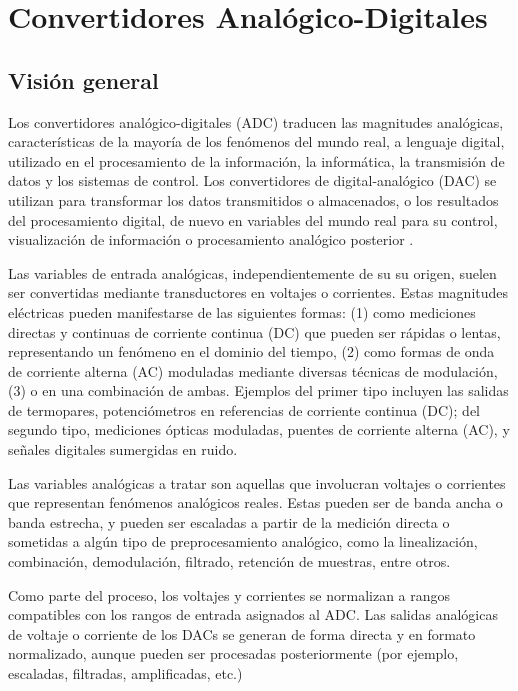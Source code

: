   \section{Convertidores Analógico-Digitales}

    \subsection{Visión general}

    Los convertidores analógico-digitales (ADC) traducen las magnitudes analógicas, características de la mayoría de los fenómenos del mundo real, a lenguaje digital, utilizado en el procesamiento de la información, la informática, la transmisión de datos y los sistemas de control. Los convertidores de digital-analógico (DAC) se utilizan para transformar los datos transmitidos o almacenados, o los resultados del procesamiento digital, de nuevo en variables del mundo real para su control, visualización de información o procesamiento analógico posterior \cite{Kester2007}.

    Las variables de entrada analógicas, independientemente de su su origen, suelen ser convertidas mediante transductores en voltajes o corrientes. Estas magnitudes eléctricas pueden manifestarse de las siguientes formas: (1) como mediciones directas y continuas de corriente continua (DC) que pueden ser rápidas o lentas, representando un fenómeno en el dominio del tiempo, (2) como formas de onda de corriente alterna (AC) moduladas mediante diversas técnicas de modulación, (3) o en una combinación de ambas. Ejemplos del primer tipo incluyen las salidas de termopares, potenciómetros en referencias de corriente continua (DC); del segundo tipo, mediciones ópticas moduladas, puentes de corriente alterna (AC), y señales digitales sumergidas en ruido.

    Las variables analógicas a tratar son aquellas que involucran voltajes o corrientes que representan fenómenos analógicos reales. Estas pueden ser de banda ancha o banda estrecha, y pueden ser escaladas a partir de la medición directa o sometidas a algún tipo de preprocesamiento analógico, como la linealización, combinación, demodulación, filtrado, retención de muestras, entre otros.

    Como parte del proceso, los voltajes y corrientes se normalizan a rangos compatibles con los rangos de entrada asignados al ADC. Las salidas analógicas de voltaje o corriente de los DACs se generan de forma directa y en formato normalizado, aunque pueden ser procesadas posteriormente (por ejemplo, escaladas, filtradas, amplificadas, etc.)

